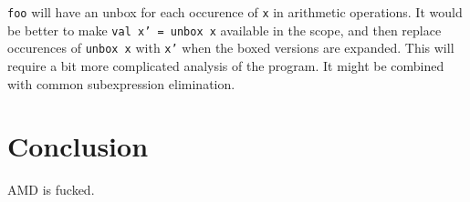 \documentclass{article}
\begin{document}
\texttt{foo} will have an unbox for each occurence of \texttt{x} in arithmetic operations. It would be better to make \texttt{val x' = unbox x} available in the scope, and then replace occurences of \texttt{unbox x} with \texttt{x'} when the boxed versions are expanded. This will require a bit more complicated analysis of the program. It might be combined with common subexpression elimination.

\section{Conclusion}

AMD is fucked.




\end{document}
